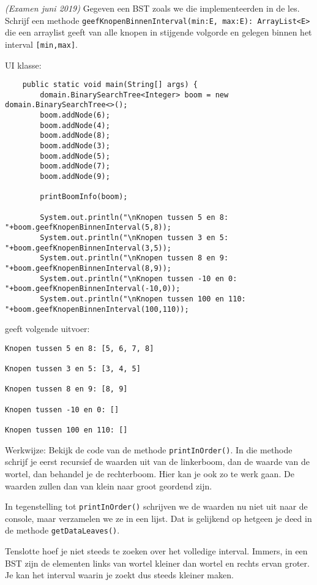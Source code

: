 \begin{oef}
\code \emph{(Examen juni 2019)} Gegeven een BST zoals we die implementeerden in de les. Schrijf een methode \verb+geefKnopenBinnenInterval(min:E, max:E): ArrayList<E>+ die een arraylist geeft van alle knopen in stijgende volgorde en gelegen binnen het interval \verb+[min,max]+. 

UI klasse:
\begin{lstlisting}
    public static void main(String[] args) {
        domain.BinarySearchTree<Integer> boom = new domain.BinarySearchTree<>();
        boom.addNode(6);
        boom.addNode(4);
        boom.addNode(8);
        boom.addNode(3);
        boom.addNode(5);
        boom.addNode(7);
        boom.addNode(9);

        printBoomInfo(boom);

        System.out.println("\nKnopen tussen 5 en 8: "+boom.geefKnopenBinnenInterval(5,8));
        System.out.println("\nKnopen tussen 3 en 5: "+boom.geefKnopenBinnenInterval(3,5));
        System.out.println("\nKnopen tussen 8 en 9: "+boom.geefKnopenBinnenInterval(8,9));
        System.out.println("\nKnopen tussen -10 en 0: "+boom.geefKnopenBinnenInterval(-10,0));
        System.out.println("\nKnopen tussen 100 en 110: "+boom.geefKnopenBinnenInterval(100,110));
\end{lstlisting}
geeft volgende uitvoer:
\begin{lstlisting}
Knopen tussen 5 en 8: [5, 6, 7, 8]

Knopen tussen 3 en 5: [3, 4, 5]

Knopen tussen 8 en 9: [8, 9]

Knopen tussen -10 en 0: []

Knopen tussen 100 en 110: []
\end{lstlisting}
\begin{opl}
Werkwijze: Bekijk de code van de methode \verb/printInOrder()/. In die methode schrijf je eerst recursief de waarden uit van de linkerboom, dan de waarde van de wortel, dan behandel je de rechterboom. Hier kan je ook zo te werk gaan. De waarden zullen dan van klein naar groot geordend zijn. 

In tegenstelling tot \verb/printInOrder()/ schrijven we de waarden nu niet uit naar de console, maar verzamelen we ze in een lijst. Dat is gelijkend op hetgeen je deed in de methode \verb/getDataLeaves()/. 

Tenslotte hoef je niet steeds te zoeken over het volledige interval. Immers, in een BST zijn de elementen links van wortel kleiner dan wortel en rechts ervan groter. Je kan het interval waarin je zoekt dus steeds kleiner maken.


\end{opl}
\end{oef}
